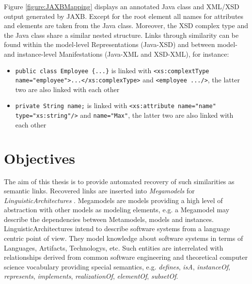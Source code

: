 Figure \ref{figure:JAXBMapping} displays an annotated \gls{Java} class and \gls{XML}/\gls{XSD} output generated by \gls{JAXB}.
Except for the root element all names for attributes and elements are taken from the \gls{Java} class.
Moreover, the \gls{XSD} complex type and the \gls{Java} class share a similar nested structure.
Links through similarity can be found within the model-level \glspl{Representation} (\gls{Java}-\gls{XSD}) and between model- and instance-level \glspl{Manifestation} (\gls{Java}-\gls{XML} and \gls{XSD}-\gls{XML}), for instance:
\begin{itemize}
\item
\texttt{public class Employee \{...\}} is linked with \texttt{<xs:complextType name="employee">...</xs:complexType>}
and \texttt{<employee .../>}, the latter two are also linked with each other

\item
\texttt{private String name;} is linked with \texttt{<xs:attribute name="name" type="xs:string"/>} and \texttt{name="Max"}, the latter two are also linked with each other
\end{itemize}


\section{Objectives}
\label{section:Objectives}

The aim of this thesis is to provide automated recovery of such similarities as semantic links.
Recovered links are inserted into \textit{\glspl{Megamodel}} \cite{DBLP:conf/sattose/BaggeZ14} \cite{DBLP:journals/entcs/FavreN05} for \textit{\glspl{LinguisticArchitecture}} \cite{DBLP:conf/models/FavreLV12} \cite{DBLP:conf/ecmdafa/LammelV14} \cite{HeinzLV17}.
\Glspl{Megamodel} are models providing a high level of abstraction with other models as modeling elements, e.g. a \gls{Megamodel} may describe the dependencies between \glspl{Metamodel}, models and instances.
\Glspl{LinguisticArchitecture} intend to describe software systems from a language centric point of view.
They model knowledge about software systems in terms of \glspl{Language}, \glspl{Artifact}, \glspl{Technology}, etc.
Such entities are interrelated with relationships derived from common software engineering and theoretical computer science vocabulary providing special semantics, e.g. \textit{defines}, \textit{isA}, \textit{instanceOf}, \textit{represents}, \textit{implements}, \textit{realizationOf}, \textit{elementOf}, \textit{subsetOf}.

